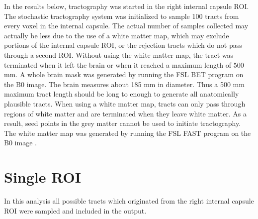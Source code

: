 In the results below, tractography was started in the right internal capsule ROI.  The stochastic tractography system was initialized to sample 100 tracts from every voxel in the internal capsule.  The actual number of samples collected may actually be less due to the use of a white matter map, which may exclude portions of the internal capsule ROI, or the rejection tracts which do not pass through a second ROI.  Without using the white matter map, the tract was terminated when it left the brain or when it reached a maximum length of 500 mm.  A whole brain mask was generated by running  the FSL BET program \cite{jenkinson05} on the B0 image.  The brain measures about 185 mm in diameter.  Thus a 500 mm maximum tract length should be long to enough to generate all anatomically plausible tracts.  When using a white matter map, tracts can only pass through regions of white matter and are terminated when they leave white matter.  As a result, seed points in the grey matter cannot be used to initiate tractography.  The white matter map was generated by running the FSL FAST program on the B0 image \cite{zhang01}.

\section{Single ROI}
In this analysis all possible tracts which originated from the right internal capsule ROI were sampled and included in the output.

